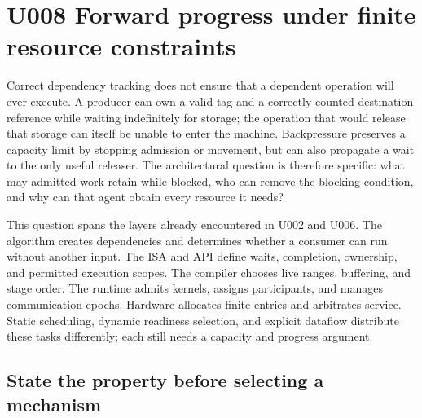 \section{U008 Forward progress under finite resource constraints}
\label{sec:u008}

Correct dependency tracking does not ensure that a dependent operation will ever execute. A producer can own a valid tag and a correctly counted destination reference while waiting indefinitely for storage; the operation that would release that storage can itself be unable to enter the machine. Backpressure preserves a capacity limit by stopping admission or movement, but can also propagate a wait to the only useful releaser. The architectural question is therefore specific: what may admitted work retain while blocked, who can remove the blocking condition, and why can that agent obtain every resource it needs?

This question spans the layers already encountered in U002 and U006. The algorithm creates dependencies and determines whether a consumer can run without another input. The ISA and API define waits, completion, ownership, and permitted execution scopes. The compiler chooses live ranges, buffering, and stage order. The runtime admits kernels, assigns participants, and manages communication epochs. Hardware allocates finite entries and arbitrates service. Static scheduling, dynamic readiness selection, and explicit dataflow distribute these tasks differently; each still needs a capacity and progress argument.

\subsection{State the property before selecting a mechanism}

